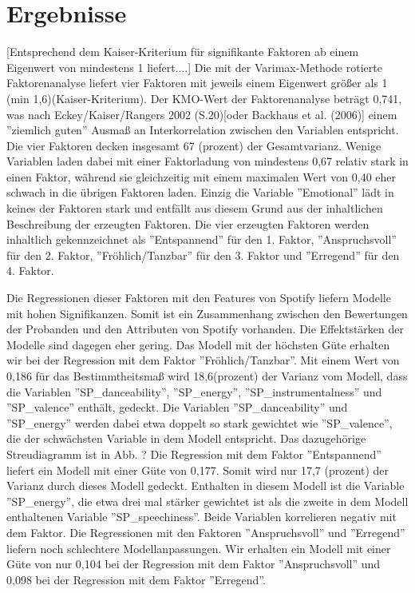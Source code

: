 \section*{Ergebnisse}
\label{sec:Ergebnisse}
[Entsprechend dem Kaiser-Kriterium für signifikante Faktoren ab einem Eigenwert von mindestens 1 liefert....]
Die mit der Varimax-Methode rotierte Faktorenanalyse liefert vier Faktoren mit jeweils einem Eigenwert größer als 1 (min 1,6)(Kaiser-Kriterium).
Der KMO-Wert der Faktorenanalyse beträgt 0,741, was nach Eckey/Kaiser/Rangers 2002 (S.20)[oder Backhaus et al. (2006)] einem ''ziemlich guten'' Ausmaß an Interkorrelation zwischen den Variablen entspricht.
Die vier Faktoren decken insgesamt 67 (prozent) der Gesamtvarianz. Wenige Variablen laden dabei mit einer Faktorladung von mindestens 0,67 relativ stark in einen Faktor, während sie gleichzeitig mit einem maximalen Wert von 0,40 eher schwach in die übrigen Faktoren laden. Einzig die Variable ''Emotional'' lädt in keines der Faktoren stark und entfällt aus diesem Grund aus der inhaltlichen Beschreibung der erzeugten Faktoren. Die vier erzeugten Faktoren werden inhaltlich gekennzeichnet als ''Entspannend'' für den 1. Faktor, ''Anspruchsvoll'' für den 2. Faktor, ''Fröhlich/Tanzbar'' für den 3. Faktor und ''Erregend'' für den 4. Faktor.   

Die Regressionen dieser Faktoren mit den Features von Spotify liefern Modelle mit hohen Signifikanzen. Somit ist ein Zusammenhang zwischen den Bewertungen der Probanden und den Attributen von Spotify vorhanden. Die Effektstärken der Modelle sind dagegen eher gering. 
Das Modell mit der höchsten Güte erhalten wir bei der Regression mit dem Faktor ''Fröhlich/Tanzbar''.
Mit einem Wert von 0,186 für das Bestimmtheitsmaß wird 18,6(prozent) der Varianz vom Modell, dass die Variablen ''SP_danceability'', ''SP_energy'', ''SP_instrumentalness'' und ''SP_valence'' enthält, gedeckt. Die Variablen ''SP_danceability'' und ''SP_energy'' werden dabei etwa doppelt so stark gewichtet wie ''SP_valence'', die der schwächsten Variable in dem Modell entspricht. Das dazugehörige Streudiagramm ist in Abb. ?   
Die Regression mit dem Faktor ''Entspannend'' liefert ein Modell mit einer Güte von 0,177. Somit wird nur 17,7 (prozent) der Varianz durch dieses Modell gedeckt. Enthalten in diesem Modell ist die Variable ''SP_energy'', die etwa drei mal stärker gewichtet ist als die zweite in dem Modell enthaltenen Variable ''SP_speechiness''. Beide Variablen korrelieren negativ mit dem Faktor. 
Die  Regressionen mit den Faktoren ''Anspruchsvoll'' und ''Erregend'' liefern noch schlechtere Modellanpassungen. Wir erhalten ein Modell mit einer Güte von nur 0,104 bei der Regression mit dem Faktor ''Anspruchsvoll'' und 0,098 bei der Regression mit dem Faktor ''Erregend''. 

